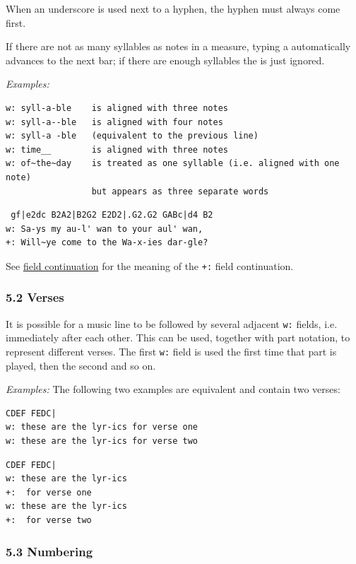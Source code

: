 \documentclass[oneside]{book}
\begin{document}
When an underscore is used next to a hyphen, the hyphen must always come
first.

If there are not as many syllables as notes in a measure, typing a
\texttt{\textbar{}} automatically advances to the next bar; if there are
enough syllables the \texttt{\textbar{}} is just ignored.

\emph{Examples:}

\begin{verbatim}
w: syll-a-ble    is aligned with three notes
w: syll-a--ble   is aligned with four notes
w: syll-a -ble   (equivalent to the previous line)
w: time__        is aligned with three notes
w: of~the~day    is treated as one syllable (i.e. aligned with one note)
                 but appears as three separate words
\end{verbatim}

\begin{verbatim}
 gf|e2dc B2A2|B2G2 E2D2|.G2.G2 GABc|d4 B2
w: Sa-ys my au-l' wan to your aul' wan,
+: Will~ye come to the Wa-x-ies dar-gle?
\end{verbatim}

See \protect\hyperlink{field_continuation}{field continuation} for the
meaning of the \texttt{+:} field continuation.

\hypertarget{verses}{\subsubsection{5.2 Verses}\label{verses}}

It is possible for a music line to be followed by several adjacent
\texttt{w:} fields, i.e. immediately after each other. This can be used,
together with part notation, to represent different verses. The first
\texttt{w:} field is used the first time that part is played, then the
second and so on.

\emph{Examples:} The following two examples are equivalent and contain
two verses:

\begin{verbatim}
CDEF FEDC|
w: these are the lyr-ics for verse one
w: these are the lyr-ics for verse two
\end{verbatim}

\begin{verbatim}
CDEF FEDC|
w: these are the lyr-ics
+:  for verse one
w: these are the lyr-ics
+:  for verse two  
\end{verbatim}

\hypertarget{numbering}{\subsubsection{5.3 Numbering}\label{numbering}}
\end{document}
